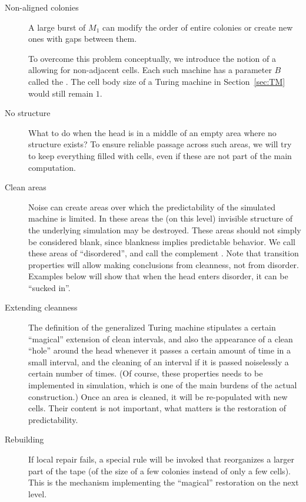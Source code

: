 \documentclass[11pt]{memoir}
\theoremstyle{definition} %
\def\B{B}
\begin{document}
\begin{description}

\item[Non-aligned colonies] A large burst of \( M_{1} \) can modify the order of
entire colonies or create new ones with gaps between them.

To overcome this problem conceptually, we 
introduce the notion of a 
allowing for non-adjacent cells.
Each such machine has a parameter \( \B \) called the .
The cell body size of a Turing machine in Section~\ref{sec:TM} would still remain
\( 1 \).

    \item[No structure] What to do when the head is in a middle of an empty area
       where no structure exists?
To ensure reliable passage across such areas,
we will try to keep everything filled with cells, even if these are
not part of the main computation.

\item[Clean areas]
    Noise can create areas over
which the predictability of the simulated machine is limited.
In these areas the (on this level) invisible structure
of the underlying simulation may be destroyed.
These areas should not simply be considered blank, since
blankness implies predictable behavior.
We call these areas of  ``disordered'', and call the complement .
Note that transition properties will allow
making conclusions from cleanness, not from disorder.
Examples below will show that when the head enters disorder, it can be ``sucked in''.


\item[Extending cleanness]
 The definition of the generalized
Turing machine stipulates a certain ``magical'' extension of clean intervals,
and also the appearance of a clean ``hole'' around the head 
whenever it passes a certain amount of time in a small interval,
and the cleaning of an interval if it is passed noiselessly a certain number of times.
(Of course, these properties needs to be implemented in simulation, which is one of the
main burdens of the actual construction.)
Once an area is cleaned, it will be re-populated with new cells.
Their content is not important, what matters is the restoration of predictability.

\item[Rebuilding] If local repair fails, a special rule will be invoked that reorganizes a
larger part of the tape (of the size of a few colonies instead of only a few cells).
This is the mechanism implementing the ``magical'' restoration on the next level.

\end{description}
\end{document}
